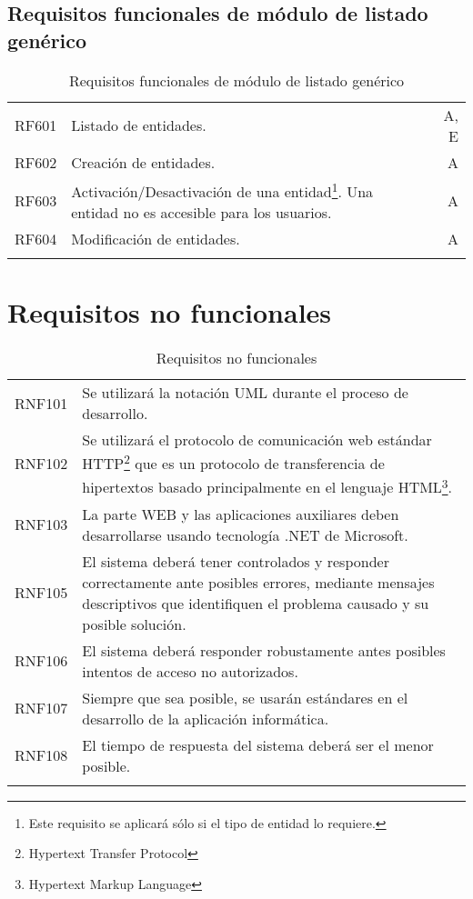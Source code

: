 \subsection{Requisitos funcionales de módulo de listado genérico}
\label{cuadro:requisitos-funcionales-de-listado-generico}
\begin{longtable}{l|p{13cm}|r}
  RF601\label{RF601} & Listado de entidades. & A, E \\
  RF602\label{RF602} & Creación de entidades. & A \\
  RF603\label{RF603} & Activación/Desactivación de una entidad\footnote{Este requisito se aplicará sólo si el tipo de entidad lo requiere.}. Una entidad no es accesible para los usuarios. & A \\
  RF604\label{RF604} & Modificación de entidades. & A \\
  \caption{Requisitos funcionales de módulo de listado genérico} \\
\end{longtable}

\section{Requisitos no funcionales}

\label{cuadro:requisitos-no-funcionales}
\begin{longtable}{l|p{13.7cm}}  
  RNF101\label{RNF101} & Se utilizará la notación UML durante el proceso de desarrollo. \\
  RNF102\label{RNF102} & Se utilizará el protocolo de comunicación web estándar HTTP\footnote{Hypertext Transfer Protocol} que es un protocolo de transferencia de hipertextos basado principalmente en el lenguaje HTML\footnote{Hypertext Markup Language }. \\
  RNF103\label{RNF103} & La parte WEB y las aplicaciones auxiliares deben desarrollarse usando tecnología .NET de Microsoft. \\
  RNF105\label{RNF104} & El sistema deberá tener controlados y responder correctamente ante posibles errores, mediante mensajes descriptivos que identifiquen el problema causado y su posible solución. \\
  RNF106\label{RNF105} & El sistema deberá responder robustamente antes posibles intentos de acceso no autorizados. \\
  RNF107\label{RNF107} & Siempre que sea posible, se usarán estándares en el desarrollo de la aplicación informática. \\
  RNF108\label{RNF108} & El tiempo de respuesta del sistema deberá ser el menor posible. \\
  \caption{Requisitos no funcionales} \\
\end{longtable}

